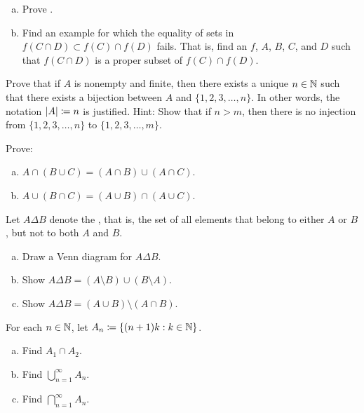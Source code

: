 \begin{exercise}
\leavevmode
\begin{enumerate}[a)]
\item
Prove .
\item
Find an example for which the equality of sets
in 
$f( C \cap D) \subset f (C) \cap f (D)$
fails.  That is, find an $f$, $A$, $B$, $C$, and $D$ such that
$f( C \cap D)$ is a proper subset of $f(C) \cap f(D)$.
\end{enumerate}
\end{exercise}

\begin{exercise}[Tricky]
Prove that if $A$ is nonempty and finite, then there exists a unique
$n \in {\mathbb{N}}$ such
that there exists a bijection between $A$ and $\{ 1, 2, 3, \ldots, n \}$.
In other words, the notation $\lvert {A} \rvert \coloneqq n$ is justified.
Hint: Show that if $n > m$, then there is no injection from
$\{ 1, 2, 3, \ldots, n \}$ to
$\{ 1, 2, 3, \ldots, m \}$.
\end{exercise}


\begin{exercise}
Prove:
\begin{enumerate}[a)]
\item $A \cap (B \cup C) = (A \cap B) \cup (A \cap C)$.
\item $A \cup (B \cap C) = (A \cup B) \cap (A \cup C)$.
\end{enumerate}
\end{exercise}

\begin{samepage}
\begin{exercise}
Let $A \Delta B$ denote the
\emph{}, that is, the set of all elements that
belong to either $A$ or $B$, but not to both $A$ and $B$.
\begin{enumerate}[a)]
\item
Draw a Venn diagram for
$A \Delta B$.
\item
Show $A \Delta B = (A \setminus B) \cup (B \setminus A)$.
\item
Show $A \Delta B = (A \cup B) \setminus ( A \cap B)$.
\end{enumerate}
\end{exercise}
\end{samepage}

\begin{exercise}
For each $n \in {\mathbb{N}}$, let $A_n \coloneqq \{ (n+1)k : k \in {\mathbb{N}} \}$.
\begin{enumerate}[a)]
\item Find $A_1 \cap A_2$.
\item Find $\bigcup_{n=1}^\infty A_n$.
\item Find $\bigcap_{n=1}^\infty A_n$.
\end{enumerate}
\end{exercise}

